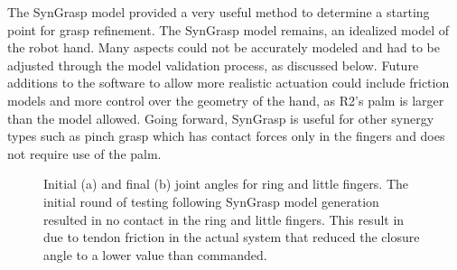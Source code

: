 \documentclass[runningheads,a4paper]{llncs}
\begin{document}

The SynGrasp model provided a very useful method to determine a starting point for grasp refinement. The SynGrasp model remains, an idealized model of the robot hand. Many aspects could not be accurately modeled and had to be adjusted through the model validation process, as discussed below. Future additions to the software to allow more realistic actuation could include friction models and more control over the geometry of the hand, as R2's palm is larger than the model allowed. Going forward, SynGrasp is useful for other synergy types such as pinch grasp which has contact forces only in the fingers and does not require use of the palm. 

\begin{figure}[!b]
\centering
\null\hfill
	\quad
	\hfill
	\hfill\null
  \caption{Initial (a) and final (b) joint angles for ring and little fingers. The initial round of testing following SynGrasp model generation resulted in no contact in the ring and little fingers.  This result in due to tendon friction in the actual system that reduced the closure angle to a lower value than commanded.}%
\label{pinkymodels}%
\end{figure}
\end{document}
